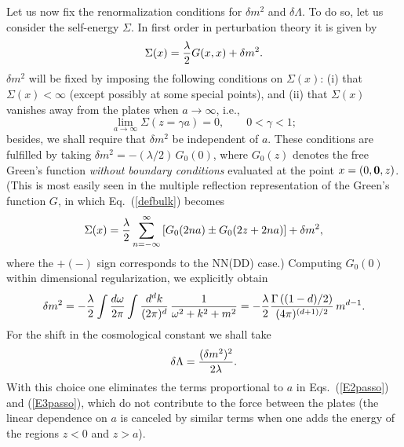 \documentclass[a4paper,dvips,12pt]{article}
\begin{document}
Let us now fix the renormalization conditions for 
$\delta m^2$ and $\delta\Lambda$.
To do so, let us consider the self-energy $\Sigma$. In first order 
in perturbation theory it is given by
\begin {equation}
\label {defbulk}
\Sigma(x)={\lambda\over 2}G(x,x)+\delta m^{2}.
\end {equation}
$\delta m^{2}$ will be fixed by imposing the following conditions 
on $\Sigma(x)$: (i) that $\Sigma(x)<\infty$ (except possibly
at some special points), and (ii) that $\Sigma(x)$ vanishes
away from the plates when $a\to\infty$, i.e.,
\begin {equation}
\label {condbulk}
\lim_{a\to\infty}\Sigma(z=\gamma a)=0,\qquad 0<\gamma<1;
\end {equation}
besides, we shall require that $\delta m^2$ be independent
of $a$. These conditions are fulfilled by taking
$\delta m^2=-(\lambda/2)\,G_0(0)$, where $G_{0}(z)$ denotes the free Green's 
function {\em without boundary conditions} evaluated at the point $x=(0,{\bf 0},z)$.
(This is most easily seen in the multiple reflection representation
of the Green's function $G$, in which Eq.\ (\ref{defbulk}) becomes
\begin {equation}
\Sigma(x)={\lambda\over 2}\sum_{n=-\infty}^{\infty}
\left[G_{0}(2na)\pm G_0(2z+2na)\right]+\delta m^{2},
\end {equation}
where the $+(-)$ sign corresponds to the NN(DD) case.) Computing
$G_0(0)$ within dimensional regularization, we explicitly
obtain
\begin {equation}
\label{dm2}
\delta m^2=-\frac{\lambda}{2}\int {d\omega\over 2\pi}\int {d^{d}k\over(2\pi)^{d}}\,
{1\over\omega^{2}+k^{2}+m^{2}}
=-{\lambda\over 2}{\Gamma\left((1-d)/2\right)\over (4\pi)^{(d+1)/2}}\,m^{d-1}.
\end {equation}
For the shift in the cosmological constant we shall take
\begin {equation}
\label{dL}
\delta\Lambda={(\delta m^{2})^{2}\over 2\lambda}.
\end {equation}
With this choice one eliminates the terms proportional to $a$ in 
Eqs.\ (\ref{E2passo}) and (\ref{E3passo}), which do not contribute
to the force between the plates (the linear dependence on $a$ is canceled
by similar terms when one adds the energy of the regions $z<0$
and $z>a$).
\end{document}

